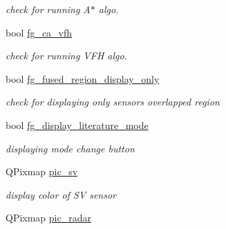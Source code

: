\begin{DoxyCompactItemize}
\begin{DoxyCompactList}\small\item\em check for running A$\ast$ algo. \end{DoxyCompactList}\item 
\hypertarget{class_sensor_info_a52869f08515c02e4ad3e1b1c8f07577e}{}bool \hyperlink{class_sensor_info_a52869f08515c02e4ad3e1b1c8f07577e}{fg\+\_\+ca\+\_\+vfh}\label{class_sensor_info_a52869f08515c02e4ad3e1b1c8f07577e}

\begin{DoxyCompactList}\small\item\em check for running V\+F\+H algo. \end{DoxyCompactList}\item 
\hypertarget{class_sensor_info_ac8296477bcba77644ce34fac1b7087a9}{}bool \hyperlink{class_sensor_info_ac8296477bcba77644ce34fac1b7087a9}{fg\+\_\+fused\+\_\+region\+\_\+display\+\_\+only}\label{class_sensor_info_ac8296477bcba77644ce34fac1b7087a9}

\begin{DoxyCompactList}\small\item\em check for displaying only sensors\textquotesingle{} overlapped region \end{DoxyCompactList}\item 
\hypertarget{class_sensor_info_acb3b875ad574515cbb67c06a23fc74c1}{}bool \hyperlink{class_sensor_info_acb3b875ad574515cbb67c06a23fc74c1}{fg\+\_\+display\+\_\+literature\+\_\+mode}\label{class_sensor_info_acb3b875ad574515cbb67c06a23fc74c1}

\begin{DoxyCompactList}\small\item\em displaying mode change button \end{DoxyCompactList}\item 
\hypertarget{class_sensor_info_a1b395f161a1e8fa5562f4e48f0ca2865}{}Q\+Pixmap \hyperlink{class_sensor_info_a1b395f161a1e8fa5562f4e48f0ca2865}{pic\+\_\+sv}\label{class_sensor_info_a1b395f161a1e8fa5562f4e48f0ca2865}

\begin{DoxyCompactList}\small\item\em display color of S\+V sensor \end{DoxyCompactList}\item 
\hypertarget{class_sensor_info_a528cfd0ab5a94093f2e3767ea765c988}{}Q\+Pixmap \hyperlink{class_sensor_info_a528cfd0ab5a94093f2e3767ea765c988}{pic\+\_\+radar}\label{class_sensor_info_a528cfd0ab5a94093f2e3767ea765c988}


\end{DoxyCompactItemize}
